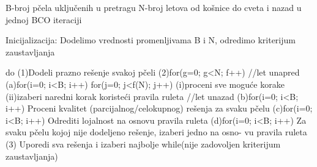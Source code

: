 \documentclass{article}
\begin{document}

\begin{verbbox}[\small\slshape]
B-broj pčela uključenih u pretragu
N-broj letova od košnice do cveta i nazad u jednoj BCO iteraciji

Inicijalizacija: Dodelimo vrednosti promenljivama B i N, odredimo kriterijum 
                 zaustavljanja

do
   (1)Dodeli prazno rešenje svakoj pčeli
   (2)for(g=0; g<N; f++)
        //let unapred
        (a)for(i=0; i<B; i++)
             for(j=0; j<f(N); j++)
                (i)proceni sve moguće korake
                (ii)izaberi naredni korak koristeći pravila ruleta
        //let unazad
        (b)for(i=0; i<B; i++)
              Proceni kvalitet (parcijalnog/celokupnog) rešenja za svaku pčelu
        (c)for(i=0; i<B; i++)
              Odrediti lojalnost na osnovu pravila ruleta
        (d)for(i=0; i<B; i++)
              Za svaku pčelu kojoj nije dodeljeno rešenje, izaberi jedno na osno-
              vu pravila ruleta
    (3) Uporedi sva rešenja i izaberi najbolje
while(nije zadovoljen kriterijum zaustavljanja)

\end{verbbox}
\fbox{\theverbbox}
\end{document}
